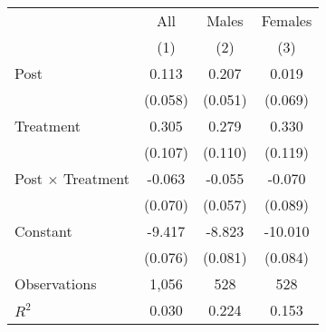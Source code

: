\begin{tabular}{@{}l*{3}{c}}
\toprule \toprule
  & All & Males & Females \\
  & (1) & (2)   & (3)     \\ 
\toprule
Post                &       0.113\sym{*}  &       0.207\sym{***}&       0.019         \\
                    &     (0.058)         &     (0.051)         &     (0.069)         \\
Treatment           &       0.305\sym{**} &       0.279\sym{**} &       0.330\sym{**} \\
                    &     (0.107)         &     (0.110)         &     (0.119)         \\
Post $\times$ Treatment&      -0.063         &      -0.055         &      -0.070         \\
                    &     (0.070)         &     (0.057)         &     (0.089)         \\
Constant            &      -9.417\sym{***}&      -8.823\sym{***}&     -10.010\sym{***}\\
                    &     (0.076)         &     (0.081)         &     (0.084)         \\
Observations        &       1,056         &         528         &         528         \\
\(R^2\)             &       0.030         &       0.224         &       0.153         \\
\bottomrule \bottomrule \end{tabular}
